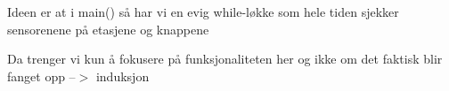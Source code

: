 Ideen er at i main() så har vi en evig while-\/løkke som hele tiden sjekker sensorenene på etasjene og knappene

Da trenger vi kun å fokusere på funksjonaliteten her og ikke om det faktisk blir fanget opp --$>$ induksjon 